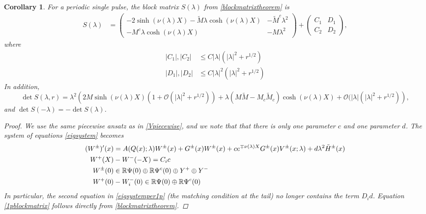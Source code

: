 \documentclass[11pt,reqno]{amsart}
\theoremstyle{plain}
\newtheorem{corollary}[theorem]{Corollary}
\theoremstyle{definition}
\theoremstyle{remark}
\begin{document}
\begin{corollary}\label{corr:2blockmatrix}
For a periodic single pulse, the block matrix $S(\lambda)$ from \cref{blockmatrixtheorem} is 
\begin{align}\label{1pblockmatrix}
S(\lambda) &= 
\begin{pmatrix}
-2 \sinh(\nu(\lambda) X) - \tilde{M}\lambda \cosh(\nu(\lambda) X) & -\tilde{M}^c \lambda^2 \\
-M^c \lambda \cosh(\nu(\lambda)X) & - M \lambda^2
\end{pmatrix} +
\begin{pmatrix}
C_1 & D_1 \\ C_2 & D_2
\end{pmatrix},
\end{align}
where
\begin{align*}
|C_1|, |C_2| &\leq C |\lambda|(|\lambda|^2 + r^{1/2}) \\
|D_1|, |D_2| &\leq C |\lambda|^2(|\lambda|^2 + r^{1/2})
\end{align*}
In addition,
\begin{equation}\label{1pblockmatrixdet}
\det S(\lambda, r) = \lambda^2 \left( 2 M \sinh(\nu(\lambda)X)(1 + \mathcal{O}(|\lambda|^2 + r^{1/2})) + \lambda(M \tilde{M} - M_c \tilde{M}_c)\cosh(\nu(\lambda)X) + \mathcal{O}(|\lambda|(|\lambda|^2 + r^{1/2}) \right),
\end{equation}
and $\det S(-\lambda) = -\det S(\lambda)$.
\begin{proof}
We use the same piecewise ansatz as in \cref{Vpiecewise}, and we note that that there is only one parameter $c$ and one parameter $d$. The system of equations \cref{eigsystem} becomes
\begin{equation}\label{eigsystemper1p}
\begin{aligned}
(W^\pm)'(x) &= A(Q(x); \lambda) W^\pm(x) + G^\pm(x) W^\pm(x) + c e^{\mp\nu(\lambda)X} G^\pm(x)V^\pm(x; \lambda) + d \lambda^2 \tilde{H}^\pm(x) \\
W^+(X) &- W^-(-X) = C_i c \\
W^\pm(0) &\in \mathbb{R} \Psi(0) \oplus \mathbb{R} \Psi^c(0) \oplus Y^+ \oplus Y^- \\
W^+(0) &- W_i^-(0) \in \mathbb{R} \Psi(0) \oplus \mathbb{R} \Psi^c(0) 
\end{aligned}
\end{equation}
In particular, the second equation in \cref{eigsystemper1p} (the matching condition at the tail) no longer contains the term $D_i d$. Equation \cref{1pblockmatrix} follows directly from \cref{blockmatrixtheorem}.


\end{proof}
\end{corollary}
\end{document}
